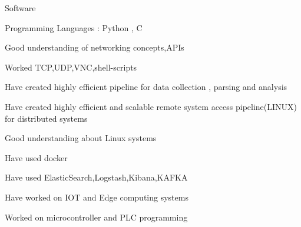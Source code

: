 \begin{cventries}
  \cventry
    {} %
    {Software} %
    {} %
    {} %
    {
      \begin{cvitems} %
        \item {Programming Languages : Python , C }
        \item {Good understanding of networking concepts,APIs}
        \item {Worked TCP,UDP,VNC,shell-scripts}
        \item {Have created highly efficient pipeline for data collection , parsing and analysis}
        \item {Have created highly efficient and scalable remote system access pipeline(LINUX) for distributed systems}
        \item {Good understanding about Linux systems}
        \item {Have used docker}
        \item {Have used ElasticSearch,Logstash,Kibana,KAFKA}
        \item {Have worked on IOT and Edge computing systems}
        \item {Worked on microcontroller and PLC programming}
      \end{cvitems}
    }

\end{cventries}

